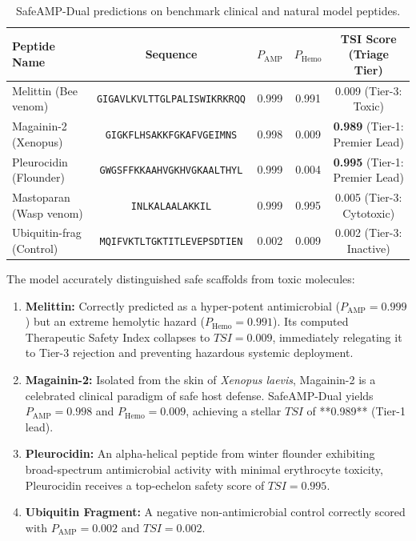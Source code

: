 \documentclass[11pt,a4paper]{article}
\begin{document}
\begin{table}[htbp]
\centering
\caption{SafeAMP-Dual predictions on benchmark clinical and natural model peptides.}
\label{tab:case_studies}
\small
\begin{tabular*}{\textwidth}{@{\extracolsep{\fill}}lcccc@{}}
\toprule
\textbf{Peptide Name} & \textbf{Sequence} & $P_{\text{AMP}}$ & $P_{\text{Hemo}}$ & \textbf{TSI Score (Triage Tier)} \\
\midrule
Melittin (Bee venom) & \texttt{GIGAVLKVLTTGLPALISWIKRKRQQ} & 0.999 & 0.991 & 0.009 (Tier-3: Toxic) \\
Magainin-2 (Xenopus) & \texttt{GIGKFLHSAKKFGKAFVGEIMNS} & 0.998 & 0.009 & \textbf{0.989} (Tier-1: Premier Lead) \\
Pleurocidin (Flounder) & \texttt{GWGSFFKKAAHVGKHVGKAALTHYL} & 0.999 & 0.004 & \textbf{0.995} (Tier-1: Premier Lead) \\
Mastoparan (Wasp venom) & \texttt{INLKALAALAKKIL} & 0.999 & 0.995 & 0.005 (Tier-3: Cytotoxic) \\
Ubiquitin-frag (Control) & \texttt{MQIFVKTLTGKTITLEVEPSDTIEN} & 0.002 & 0.009 & 0.002 (Tier-3: Inactive) \\
\bottomrule
\end{tabular*}
\end{table}

The model accurately distinguished safe scaffolds from toxic molecules:
\begin{enumerate}
    \item \textbf{Melittin:} Correctly predicted as a hyper-potent antimicrobial ($P_{\text{AMP}} = 0.999$) but an extreme hemolytic hazard ($P_{\text{Hemo}} = 0.991$). Its computed Therapeutic Safety Index collapses to $TSI = 0.009$, immediately relegating it to Tier-3 rejection and preventing hazardous systemic deployment.
    \item \textbf{Magainin-2:} Isolated from the skin of \textit{Xenopus laevis}, Magainin-2 is a celebrated clinical paradigm of safe host defense. SafeAMP-Dual yields $P_{\text{AMP}} = 0.998$ and $P_{\text{Hemo}} = 0.009$, achieving a stellar $TSI$ of **0.989** (Tier-1 lead).
    \item \textbf{Pleurocidin:} An alpha-helical peptide from winter flounder exhibiting broad-spectrum antimicrobial activity with minimal erythrocyte toxicity, Pleurocidin receives a top-echelon safety score of $TSI = 0.995$.
    \item \textbf{Ubiquitin Fragment:} A negative non-antimicrobial control correctly scored with $P_{\text{AMP}} = 0.002$ and $TSI = 0.002$.
\end{enumerate}
\end{document}
